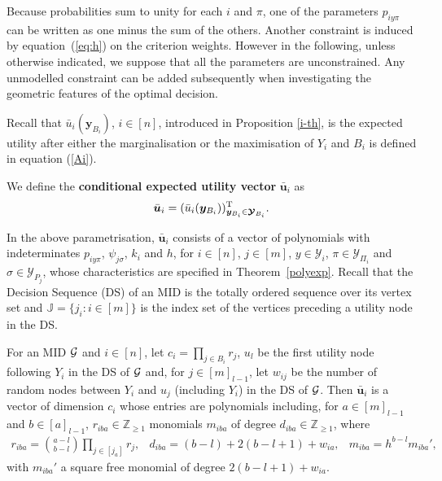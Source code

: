 Because probabilities sum to unity for each $i$ and  $\pi$, one of the parameters $p_{iy\pi}$ can be written as one minus the sum of the others. 
Another constraint is induced by equation~(\ref{eq:h}) on the criterion weights. However in the following, unless otherwise indicated, we suppose that all the parameters are unconstrained.  Any unmodelled constraint can be added subsequently when investigating the geometric features of the optimal decision.

Recall that $\bar{u}_i(\bm{y}_{B_i})$, $i\in[n]$, introduced in Proposition \ref{i-th}, is the expected utility after either the marginalisation or the maximisation of $Y_i$ and $B_i$ is defined in equation (\ref{Ai}).
\begin{definition}
We define the \textbf{conditional expected utility vector} $\bar{\bm{u}}_i$ as
\begin{equation}
\label{veccond}
\bar{\bm{u}}_i=(\bar{u}_i(\bm{y}_{B_i}))_{\bm{y}_{B_i}\in\bm{\mathcal{Y}}_{B_i}}^\T.
\end{equation}
\end{definition}

In the above parametrisation, $\bar{\bm{u}}_i$ consists of a vector of polynomials with indeterminates $p_{iy\pi}$, $\psi_{j\sigma}$, $k_i$ and $h$, for $i\in[n]$, $j\in[m]$, $y\in\mathcal{Y}_i$, $\pi\in\bm{\mathcal{Y}}_{\Pi_i}$ and $\sigma\in\bm{\mathcal{Y}}_{P_j}$,  whose characteristics are specified  in  Theorem~\ref{polyexp}. Recall that the Decision Sequence (DS) of an MID is the totally ordered sequence over its vertex set and $\mathbb{J}=\{j_i:i\in[m]\}$ is the index set of the vertices preceding a utility node in the DS.
\begin{theorem}
\label{polyexp}
For an MID $\mathcal{G}$ and $i\in [n]$, let $
c_i=\prod_{j\in B_i}r_j
$,  $u_l$ be the first utility node following $Y_i$ in the DS of $\mathcal{G}$ and, for $j\in[m]_{l-1}$, let $w_{ij}$ be the number of random nodes %
between $Y_i$ and $u_j$ (including $Y_i$)  in the DS of $\mathcal{G}$. Then $\bar{\bm{u}}_i$ is a vector of dimension $c_i$ whose entries are  polynomials including, for $a\in[m]_{l-1}$ and $b\in[a]_{l-1}$, $r_{iba}\in\mathbb{Z}_{\geq 1}$  monomials $m_{iba}$ of degree $d_{iba}\in\mathbb{Z}_{\geq 1}$, where
\begin{equation}
\label{struct}
\begin{array}{ccc}
r_{iba}= \binom{a-l}{b-l}\prod_{j\in[j_a]}r_j, &
d_{iba}= (b-l)+2(b-l+1)+w_{ia}, & m_{iba}=h^{b-l}m_{iba}',
\end{array}
\end{equation}
with $m_{iba}'$ a square free monomial of degree $2(b-l+1)+w_{ia}$.
\end{theorem}

